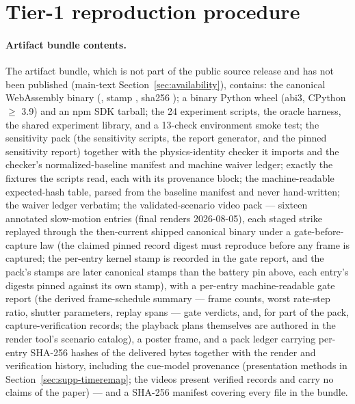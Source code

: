 \section{Tier-1 reproduction procedure}
\label{sec:appendix-repro}

\paragraph{Artifact bundle contents.}
The artifact bundle, which is not part of the public source release and
has not been published (main-text Section~\ref{sec:availability}),
contains: the canonical WebAssembly binary (,
stamp , sha256
\allowbreak{});
a binary Python wheel (abi3, CPython $\geq$ 3.9) and an npm SDK tarball;
the 24 experiment scripts, the oracle harness, the shared experiment
library, and a 13-check environment smoke test; the sensitivity pack
(the sensitivity scripts, the report generator, and the pinned
sensitivity report) together with the physics-identity
checker it imports and the checker's normalized-baseline manifest and
machine waiver ledger; exactly the fixtures the
scripts read, each with its provenance block; the machine-readable
expected-hash table, parsed from the baseline manifest and never
hand-written; the waiver ledger verbatim; the validated-scenario video
pack --- sixteen annotated
slow-motion entries (final renders 2026-08-05), each staged strike
replayed through the then-current shipped canonical binary under a
gate-before-capture law (the claimed pinned record digest must
reproduce before any frame is captured; the per-entry kernel stamp is
recorded in the gate report, and the pack's stamps are later canonical
stamps than the battery pin above, each entry's digests pinned against
its own stamp), with a per-entry machine-readable gate report
(the derived frame-schedule summary --- frame
counts, worst rate-step ratio, shutter parameters, replay spans ---
gate verdicts, and, for part
of the pack, capture-verification records; the playback plans
themselves are authored in the render tool's scenario catalog), a
poster frame, and a pack
ledger carrying per-entry SHA-256 hashes of the delivered bytes
together with the render and verification history, including the
cue-model provenance (presentation methods
in Section~\ref{sec:supp-timeremap}; the videos present verified
records and carry no claims of the paper) --- and
a SHA-256 manifest covering every file in the bundle.

